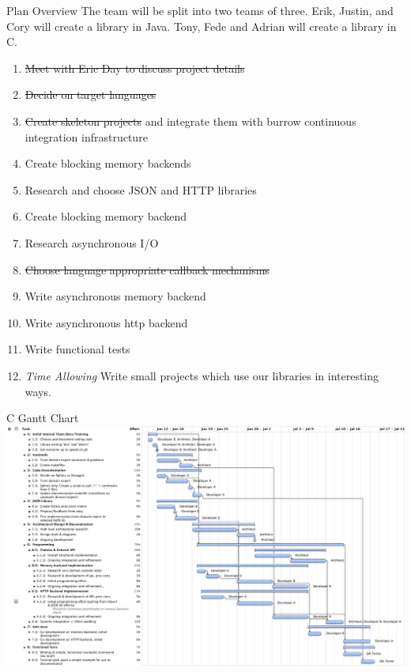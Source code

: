 \documentclass{beamer}
\begin{document}
\begin{frame}{Plan Overview}
  The team will be split into two teams of three.
  Erik, Justin, and Cory will create a library in Java.
  Tony, Fede and Adrian will create a library in C.

  \begin{enumerate}
  \item \sout{Meet with Eric Day to discuss project details}
  \item \sout{Decide on target languages}
  \item \sout{Create skeleton projects} and integrate them with burrow continuous integration infrastructure
  \item Create blocking memory backends
  \item Research and choose JSON and HTTP libraries
  \item Create blocking memory backend 
  \item Research asynchronous I/O
  \item \sout{Choose language appropriate callback mechanisms}
  \item Write asynchronous memory backend
  \item Write asynchronous http backend
  \item Write functional tests
  \item \textit{Time Allowing} Write small projects which use our libraries in interesting ways.
  \end{enumerate}
\end{frame}

\begin{frame}{C Gantt Chart}
  \includegraphics[width=0.95\linewidth]{C-Gantt.pdf}
\end{frame}
\end{document}
